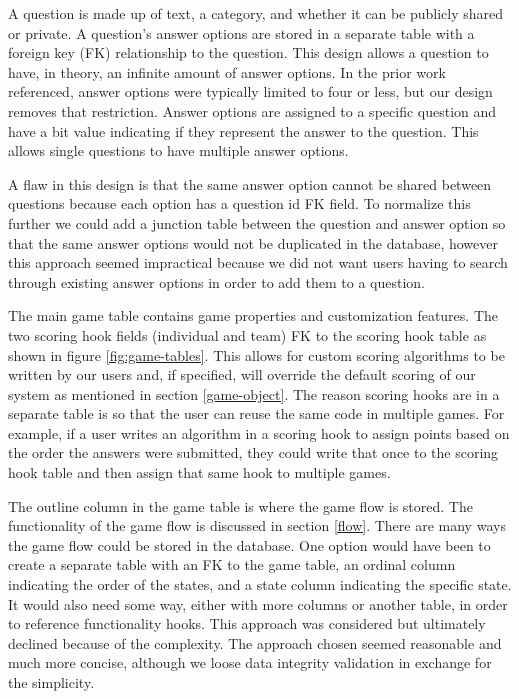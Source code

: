 \documentclass{article}
\begin{document}
    		A question is made up of text, a category, and whether it can be publicly shared or private. A question's answer options are stored in a separate table with a foreign key (FK) relationship to the question. This design allows a question to have, in theory, an infinite amount of answer options. In the prior work referenced, answer options were typically limited to four or less, but our design removes that restriction. Answer options are assigned to a specific question and have a bit value indicating if they represent the answer to the question. This allows single questions to have multiple answer options.
    		\smallskip
    		
    		A flaw in this design is that the same answer option cannot be shared between questions because each option has a question id FK field.  To normalize this further we could add a junction table between the question and answer option so that the same answer options would not be duplicated in the database, however this approach seemed impractical because we did not want users having to search through existing answer options in order to add them to a question.
    		\smallskip
    		
    		The main game table contains game properties and customization features. The two scoring hook fields (individual and team) FK to the scoring hook table as shown in figure \ref{fig:game-tables}. This allows for custom scoring algorithms to be written by our users and, if specified, will override the default scoring of our system as mentioned in section \ref{game-object}. The reason scoring hooks are in a separate table is so that the user can reuse the same code in multiple games. For example, if a user writes an algorithm in a scoring hook to assign points based on the order the answers were submitted, they could write that once to the scoring hook table and then assign that same hook to multiple games.
    		\smallskip
    		
    		The outline column in the game table is where the game flow is stored. The functionality of the game flow is discussed in section \ref{flow}. There are many ways the game flow could be stored in the database. One option would have been to create a separate table with an FK to the game table, an ordinal column indicating the order of the states, and a state column indicating the specific state. It would also need some way, either with more columns or another table, in order to reference functionality hooks. This approach was considered but ultimately declined because of the complexity. The approach chosen seemed reasonable and much more concise, although we loose data integrity validation in exchange for the simplicity.
    		\smallskip
    		
\end{document}
